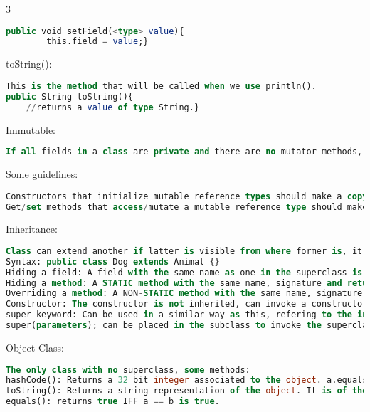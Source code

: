 \documentclass[10pt,landscape]{article}
\begin{document}
\begin{multicols}{3}
\begin{lstlisting}[language=SQL]
    public void setField(<type> value){
        this.field = value;}
\end{lstlisting}
toString():
\begin{lstlisting}[language=SQL]
This is the method that will be called when we use println(). 
public String toString(){
    //returns a value of type String.}
\end{lstlisting}
Immutable: 
\begin{lstlisting}[language=SQL]
If all fields in a class are private and there are no mutator methods, then the type is immutable. 
\end{lstlisting}
Some guidelines:
\begin{lstlisting}[language=SQL]
Constructors that initialize mutable reference types should make a copy first. 
Get/set methods that access/mutate a mutable reference type should make a copy first. 
\end{lstlisting}
Inheritance:
\begin{lstlisting}[language=SQL]
Class can extend another if latter is visible from where former is, it inherits all public and protected methods and fields from superclass.
Syntax: public class Dog extends Animal {}
Hiding a field: A field with the same name as one in the superclass is hiding the inherited field. 
Hiding a method: A STATIC method with the same name, signature and return type as the one from the superclass. 
Overriding a method: A NON-STATIC method with the same name, signature and return type as the one from the superclass.
Constructor: The constructor is not inherited, can invoke a constructor from superclass using the keyword super. If no constructor is invoked, the no-argument constructor is called, if it does not exist, compile time error.
super keyword: Can be used in a similar way as this, refering to the instance of the superclass on which a non-static method was called. Useful if the method we want to access was overriden in the subclass.
super(parameters); can be placed in the subclass to invoke the superclass constructor. 
\end{lstlisting}
Object Class:
\begin{lstlisting}[language=SQL]
The only class with no superclass, some methods:
hashCode(): Returns a 32 bit integer associated to the object. a.equals(b) is true implies a.hashCode() == b.hashCode(), the converse is false.
toString(): Returns a string representation of the object. It is of the form <classOfObj>@Obj.hashCode().
equals(): returns true IFF a == b is true. 
\end{lstlisting}

\end{multicols}
\end{document}
